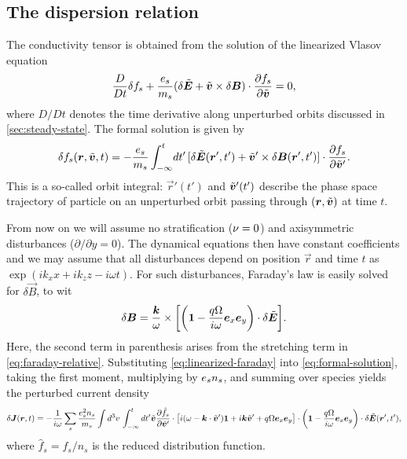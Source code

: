 \documentclass[aps,pre,notitlepage,amsmath,amssymb,amsfonts,nobibnotes,nofootinbib,superscriptaddress]{revtex4-1}
\begin{document}
\subsection{The dispersion relation}
\label{sec:conductivity-tensor}

The conductivity tensor is obtained from the solution of the linearized Vlasov
equation
\begin{equation}
  \label{eq:linear-vlasov-sheet}
  \frac{D}{Dt}\delta f_s
  + \frac{\qs}{m_s}(\delta\tvec{E} + \tvec{v}\times\delta\vec{B})
  \cdot\pder{f_s}{\tvec{v}} = 0,
\end{equation}
where $D/Dt$ denotes the time derivative along unperturbed orbits discussed in
\cref{sec:steady-state}. The formal solution is given by
\begin{equation}
  \label{eq:formal-solution}
  \delta f_s(\vec{r},\tvec{v},t) = -\frac{\qs}{m_s}\int_{-\infty}^t\!dt'\,
  [\delta\tvec{E}(\vec{r}',t') + \tvec{v}'\times\delta\vec{B}(\vec{r}',t')]
  \cdot\pder{f_s}{\tvec{v}'}.
\end{equation}
This is a so-called orbit integral: $\vec{r}'(t')$ and $\tilde{\bm{v}}'(t')$
describe the phase space trajectory of particle on an unperturbed orbit
passing through $(\bm{r},\tilde{\bm{v}})$ at time $t$.

From now on we will assume no stratification ($\nu=0$) and axisymmetric
disturbances ($\partial/\partial{}y=0$). The dynamical equations then have
constant coefficients and we may assume that all disturbances depend on
position $\vec{r}$ and time $t$ as $\exp(ik_x{}x+ik_z{}z-i\omega{}t)$. For
such disturbances, Faraday's law  is easily
solved for $\delta\vec{B}$, to wit
\begin{equation}
  \label{eq:linearized-faraday}
  \delta\vec{B} = \frac{\vec{k}}{\omega}\times\left[
    \left(\mathbf{1} - \frac{q\Omega}{i\omega}\ex\ey\right)
    \cdot\delta\tilde{\vec{E}}
  \right].
\end{equation}
Here, the second term in parenthesis arises from the stretching term in
\cref{eq:faraday-relative}. Substituting \cref{eq:linearized-faraday} into
\cref{eq:formal-solution}, taking the first moment, multiplying by $e_s{}n_s$,
and summing over species yields the perturbed current density
\begin{equation}
  \label{eq:perturbed-current}
  \delta\vec{J}(\vec{r},t)
  = -\frac{1}{i\omega}\sums\frac{\qs^2n_s}{m_s}
  \int d^3v\,\int_{-\infty}^t dt'
  \tvec{v}\pder{\hat{f}_s}{\tvec{v}'}\cdot\big[
  i(\omega - \vec{k}\cdot\tvec{v}')\mathbf{1}
  + i\vec{k}\tvec{v}' + q\Omega\ex\ey
  \big]\cdot\left(\mathbf{1} - \frac{q\Omega}{i\omega}\ex\ey\right)
  \cdot\delta\tvec{E}(\vec{r}',t'),
\end{equation}
where $\hat{f}_s=f_s/n_s$ is the reduced distribution function.
\end{document}
